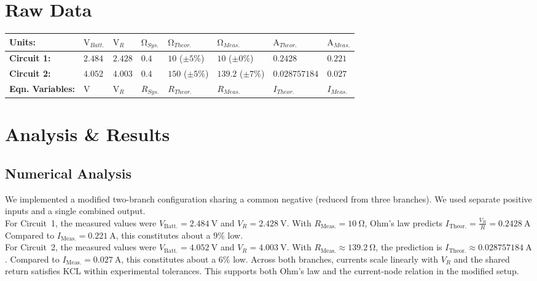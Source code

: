 \documentclass[11pt]{article}
\begin{document}
\section{Raw Data}
    \begin{tabularx}{\linewidth}{l l l l l l l l}
        \toprule
            \textbf{Units:} & \textbf{$\si{\volt_{Batt.}}$} & \textbf{$\si{\volt_{R}}$} & \textbf{$\si{\ohm_{Sys.}}$} & \textbf{$\si{\ohm_{Theor.}}$} & \textbf{$\si{\ohm_{Meas.}}$} & \textbf{$\si{\ampere_{Theor.}}$} & \textbf{$\si{\ampere_{Meas.}}$}\\
        \midrule
            \textbf{Circuit 1:} & $2.484$ & $2.428$ & $0.4$ & $10$ ($\pm5\%$) & $10$ ($\pm0\%$) & $0.2428$ & $0.221$\\
            \textbf{Circuit 2:} & $4.052$ & $4.003$ & $0.4$ & $150$ ($\pm5\%$) & $139.2$ ($\pm7\%$) & $0.028757184$ & $0.027$\\
        \bottomrule
            \textbf{Eqn. Variables:} & \textbf{$\si{\volt}$} & \textbf{$\si{\volt_{R}}$} & \textbf{$\si{R_{Sys.}}$} & \textbf{$\si{R_{Theor.}}$} & \textbf{$\si{R_{Meas.}}$} & \textbf{$\si{I_{Theor.}}$} & \textbf{$\si{I_{Meas.}}$}\\
    \end{tabularx}

\section{Analysis \& Results}
    \subsection{Numerical Analysis}
        We implemented a modified two-branch configuration sharing a common negative (reduced from three branches).
        We used separate positive inputs and a single combined output.\\
        For Circuit~1, the measured values were $V_{\text{Batt.}}=\SI{2.484}{\volt}$ and $V_R=\SI{2.428}{\volt}$.
        With $R_{\text{Meas.}}=\SI{10}{\ohm}$, Ohm’s law predicts $I_{\text{Theor.}}=\frac{V_R}{R}=\SI{0.2428}{\ampere}$
        Compared to $I_{\text{Meas.}}=\SI{0.221}{\ampere}$, this constitutes about a \(9\%\) low.\\
        For Circuit~2, the measured values were $V_{\text{Batt.}}=\SI{4.052}{\volt}$ and $V_R=\SI{4.003}{\volt}$.
        With $R_{\text{Meas.}}\approx\SI{139.2}{\ohm}$, the prediction is $I_{\text{Theor.}}\approx\SI{0.028757184}{\ampere}$.
        Compared to $I_{\text{Meas.}}=\SI{0.027}{\ampere}$, this constitutes about a \(6\%\) low.
        Across both branches, currents scale linearly with $V_R$ and the shared return satisfies KCL within experimental tolerances.
        This supports both Ohm’s law and the current-node relation in the modified setup.
\end{document}
